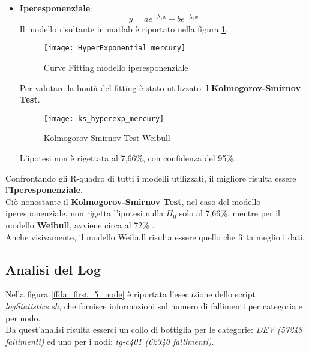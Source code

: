 \begin{itemize}
  \clearpage

  \item \textbf{Iperesponenziale}:
  $$ y = a e^{- \lambda_1  x} +  b  e^{- \lambda_2  x} $$
  Il modello risultante in matlab è riportato nella figura \ref{ffda_HyperExponential_mercury}.\\

  \begin{figure}[!htbp]
    \centering
    \texttt{[image: HyperExponential\_mercury]}
    \caption{Curve Fitting modello iperesponenziale}
    \label{ffda_HyperExponential_mercury}
  \end{figure}

  Per valutare la bontà del fitting è stato utilizzato il \textbf{Kolmogorov-Smirnov Test}.\\

  \begin{figure}[!htbp]
    \centering
    \texttt{[image: ks\_hyperexp\_mercury]}
    \caption{Kolmogorov-Smirnov Test Weibull}
    \label{ffda_ks_hyperexp_mercury}
  \end{figure}

  L'ipotesi non è rigettata al 7,66\%, con confidenza del 95\%.\\

  \clearpage
\end{itemize}

Confrontando gli R-quadro di tutti i modelli utilizzati, il migliore risulta
essere l'\textbf{Iperesponenziale}.\\
Ciò nonostante il \textbf{Kolmogorov-Smirnov Test}, nel caso del modello
iperesponenziale, non rigetta l'ipotesi nulla $H_0$ solo al 7,66\%, mentre
per il modello \textbf{Weibull}, avviene circa al 72\% .\\
Anche visivamente, il modello Weibull risulta essere quello che fitta meglio i
dati.\\

\clearpage

\subsection{Analisi del Log}
Nella figura \ref{ffda_first_5_node} è riportata l'esecuzione dello script
\textit{logStatistics.sh}, che fornisce informazioni sul numero di fallimenti
per categoria e per nodo.\\
Da quest'analisi risulta esserci un collo di bottiglia per le categorie:
\textit{DEV (57248 fallimenti)} ed uno per i nodi: \textit{tg-c401 (62340 fallimenti)}.\\

